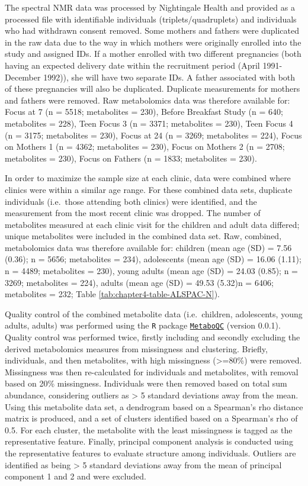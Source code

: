 \documentclass[11pt,twoside]{bristolthesis}
\begin{document}
The spectral NMR data was processed by Nightingale Health and provided as a processed file with identifiable individuals (triplets/quadruplets) and individuals who had withdrawn consent removed. Some mothers and fathers were duplicated in the raw data due to the way in which mothers were originally enrolled into the study and assigned IDs. If a mother enrolled with two different pregnancies (both having an expected delivery date within the recruitment period (April 1991-December 1992)), she will have two separate IDs. A father associated with both of these pregnancies will also be duplicated. Duplicate measurements for mothers and fathers were removed. Raw metabolomics data was therefore available for: Focus at 7 (n = 5518; metabolites = 230), Before Breakfast Study (n = 640; metabolites = 228), Teen Focus 3 (n = 3371; metabolites = 230), Teen Focus 4 (n = 3175; metabolites = 230), Focus at 24 (n = 3269; metabolites = 224), Focus on Mothers 1 (n = 4362; metabolites = 230), Focus on Mothers 2 (n = 2708; metabolites = 230), Focus on Fathers (n = 1833; metabolites = 230).

In order to maximize the sample size at each clinic, data were combined where clinics were within a similar age range. For these combined data sets, duplicate individuals (i.e.~those attending both clinics) were identified, and the measurement from the most recent clinic was dropped. The number of metabolites measured at each clinic visit for the children and adult data differed; unique metabolites were included in the combined data set. Raw, combined, metabolomics data was therefore available for: children (mean age (SD) = 7.56 (0.36); n = 5656; metabolites = 234), adolescents (mean age (SD) = 16.06 (1.11); n = 4489; metabolites = 230), young adults (mean age (SD) = 24.03 (0.85); n = 3269; metabolites = 224), adults (mean age (SD) = 49.53 (5.32)n = 6406; metabolites = 232; Table \ref{tab:chapter4-table-ALSPAC-N}).

Quality control of the combined metabolite data (i.e.~children, adolescents, young adults, adults) was performed using the \texttt{R} package \href{https://github.com/MRCIEU/MetaboQC}{\texttt{MetaboQC}} (version 0.0.1). Quality control was performed twice, firstly including and secondly excluding the derived metabolomics measures from missingness and clustering. Briefly, individuals, and then metabolites, with high missingness (\textgreater{}=80\%) were removed. Missingness was then re-calculated for individuals and metabolites, with removal based on 20\% missingness. Individuals were then removed based on total sum abundance, considering outliers as \textgreater{} 5 standard deviations away from the mean. Using this metabolite data set, a dendrogram based on a Spearman's rho distance matrix is produced, and a set of clusters identified based on a Spearman's rho of 0.5. For each cluster, the metabolite with the least missingness is tagged as the representative feature. Finally, principal component analysis is conducted using the representative features to evaluate structure among individuals. Outliers are identified as being \textgreater{} 5 standard deviations away from the mean of principal component 1 and 2 and were excluded.
\end{document}
